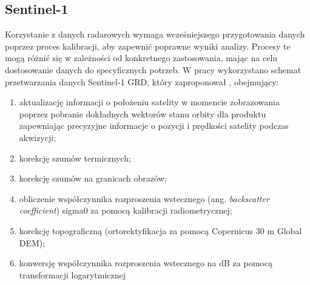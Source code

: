 \documentclass{amuthesis}
\begin{document}
\hypertarget{sec-processing-s1}{%
\subsection{Sentinel-1}\label{sec-processing-s1}}

Korzystanie z danych radarowych wymaga wcześniejszego przygotowania
danych poprzez proces kalibracji, aby zapewnić poprawne wyniki analizy.
Procesy te mogą różnić się w zależności od konkretnego zastosowania,
mając na celu dostosowanie danych do specyficznych potrzeb. W pracy
wykorzystano schemat przetwarzania danych Sentinel-1 GRD, który
zaproponował \textcite{filipponi_2019_s1_workflow}, obejmujący:

\begin{enumerate}
\def\labelenumi{\arabic{enumi}.}
\item
  aktualizację informacji o położeniu satelity w momencie zobrazowania
  poprzez pobranie dokładnych wektorów stanu orbity dla produktu
  zapewniając precyzyjne informacje o pozycji i prędkości satelity
  podczas akwizycji;
\item
  korekcję szumów termicznych;
\item
  korekcję szumów na granicach obrazów;
\item
  obliczenie współczynnika rozproszenia wstecznego (ang.
  \emph{backscatter coefficient}) sigma0 za pomocą kalibracji
  radiometrycznej;
\item
  korekcję topograficzną (ortorektyfikacja za pomocą Copernicus 30 m
  Global DEM);
\item
  konwersję współczynnika rozproszenia wstecznego na dB za pomocą
  transformacji logarytmicznej
\end{enumerate}
\end{document}
